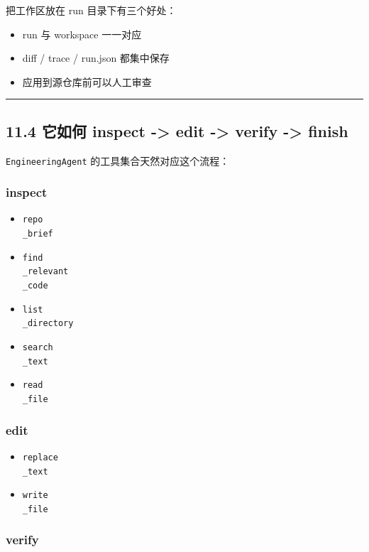 \documentclass[UTF8,12pt,openany]{ctexbook}
\begin{document}
把工作区放在 run 目录下有三个好处：\par

\begin{itemize}
\item run 与 workspace 一一对应
\item diff / trace / run.json 都集中保存
\item 应用到源仓库前可以人工审查
\end{itemize}

\hrule

\subsection{11.4 它如何 inspect -> edit -> verify -> finish}

\texttt{EngineeringAgent} 的工具集合天然对应这个流程：\par

\subsubsection{inspect}

\begin{itemize}
\item \texttt{repo\\_brief}
\item \texttt{find\\_relevant\\_code}
\item \texttt{list\\_directory}
\item \texttt{search\\_text}
\item \texttt{read\\_file}
\end{itemize}

\subsubsection{edit}

\begin{itemize}
\item \texttt{replace\\_text}
\item \texttt{write\\_file}
\end{itemize}

\subsubsection{verify}
\end{document}
